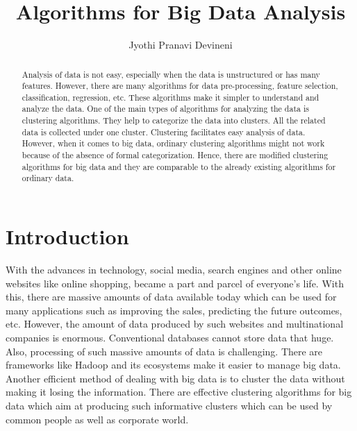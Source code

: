 \documentclass[sigconf]{acmart}
\begin{document}
\title{Algorithms for Big Data Analysis}


\author{Jyothi Pranavi Devineni}

\begin{abstract}
Analysis of data is not easy, especially when the data is unstructured or has many features. However, there are many algorithms for data pre-processing, feature selection, classification, regression, etc. These algorithms make it simpler to understand and analyze the data. One of the main types of algorithms for analyzing the data is clustering algorithms. They help to categorize the data into clusters. All the related data is collected under one cluster. Clustering facilitates easy analysis of data. However, when it comes to big data, ordinary clustering algorithms might not work because of the absence of formal categorization. Hence, there are modified clustering algorithms for big data and they are comparable to the already existing algorithms for ordinary data.
\end{abstract}



\maketitle

\section{Introduction}
With the advances in technology, social media, search engines and other online websites like online shopping, became a part and parcel of everyone's life. With this, there are massive amounts of data available today which can be used for many applications such as improving the sales, predicting the future outcomes, etc. However, the amount of data produced by such websites and multinational companies is enormous. Conventional databases cannot store data that huge. Also, processing of such massive amounts of data is challenging. There are frameworks like Hadoop and its ecosystems make it easier to manage big data. Another efficient method of dealing with big data is to cluster the data without making it losing the information. There are effective clustering algorithms for big data which aim at producing such informative clusters which can be used by common people as well as corporate world.
\end{document}
